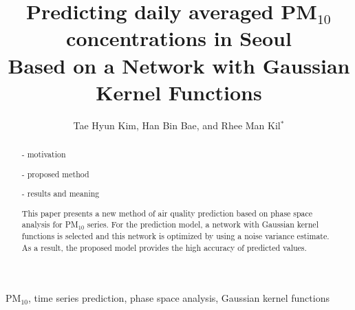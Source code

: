 \documentclass[preprint,12pt]{elsarticle}
\begin{document}
\begin{frontmatter}



\title{Predicting daily averaged PM$_{10}$ concentrations in Seoul\protect\\
         Based on a Network with Gaussian Kernel Functions}


\author{Tae Hyun Kim, Han Bin Bae, and Rhee Man Kil$^*$}

\address{College of Software, Sungkyunkwan Univesity\\
2066, Seobu-ro, Jangan-Gu, Suwon, Gyeonggi-Do, 16419 Korea}

\begin{abstract}

- motivation

- proposed method

- results and meaning

This paper presents a new method of air quality prediction based on phase space analysis for PM$_{10}$ series. For the prediction model, a network with Gaussian kernel functions is selected and this network is optimized by using a noise variance estimate. As a result, the proposed model provides the high accuracy of predicted values.

\end{abstract}

\begin{keyword}

PM$_{10}$, time series prediction, phase space analysis, Gaussian kernel functions



\end{keyword}

\end{frontmatter}
\end{document}
